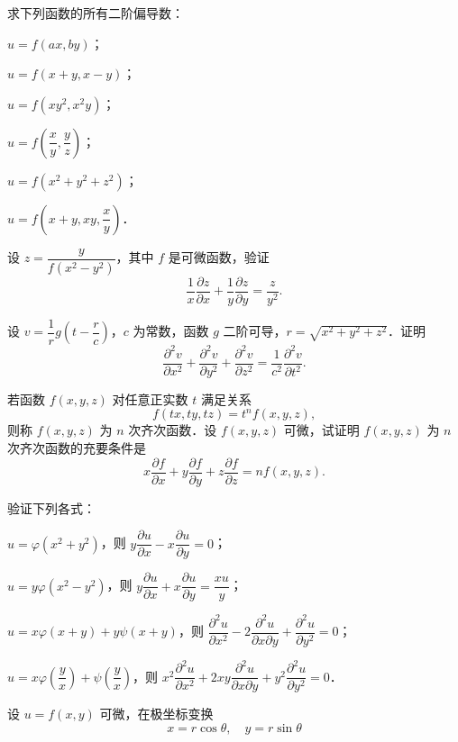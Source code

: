 \begin{xiti}
\item 求下列函数的所有二阶偏导数：
\begin{ziti}
\item $u=f(ax,by)$；
\item $u=f(x+y,x-y)$；
\item $u=f(xy^{2},x^{2}y)$；
\item $u=f\left(\dfrac{x}{y},\dfrac{y}{z}\right)$；
\item $u=f(x^{2}+y^{2}+z^{2})$；
\item $u=f\left(x+y,xy,\dfrac{x}{y}\right)$．
\end{ziti}
\item 设 $z=\dfrac{y}{f(x^{2}-y^{2})}$，其中 $f$ 是可微函数，验证
\[
\frac{1}{x}\frac{\partial z}{\partial x}+\frac{1}{y}\frac{\partial z}{\partial y}=\frac{z}{y^{2}}.
\]
\item 设 $v=\dfrac{1}{r}g\left(t-\dfrac{r}{c}\right)$，$c$ 为常数，函数 $g$ 二阶可导，$r=\sqrt{x^{2}+y^{2}+z^{2}}$．证明
\[
\frac{\partial^{2}v}{\partial x^{2}}+\frac{\partial^{2}v}{\partial y^{2}}+\frac{\partial^{2}v}{\partial z^{2}}=\frac{1}{c^{2}}\frac{\partial^{2}v}{\partial t^{2}}.
\]
\item 若函数 $f(x,y,z)$ 对任意正实数 $t$ 满足关系
\[
f(tx,ty,tz)=t^{n}f(x,y,z),
\]
则称 $f(x,y,z)$ 为 $n$ 次齐次函数．设 $f(x,y,z)$ 可微，试证明 $f(x,y,z)$ 为 $n$ 次齐次函数的充要条件是
\[
x\frac{\partial f}{\partial x}+y\frac{\partial f}{\partial y}+z\frac{\partial f}{\partial z}=nf(x,y,z).
\]
\item 验证下列各式：
\begin{ziti}
\item $u=\varphi(x^{2}+y^{2})$，则 $y\dfrac{\partial u}{\partial x}-x\dfrac{\partial u}{\partial y}=0$；
\item $u=y\varphi(x^{2}-y^{2})$，则 $y\dfrac{\partial u}{\partial x}+x\dfrac{\partial u}{\partial y}=\dfrac{xu}{y}$；
\item $u=x\varphi(x+y)+y\psi(x+y)$，则 $\dfrac{\partial^{2}u}{\partial x^{2}}-2\dfrac{\partial^{2}u}{\partial x\partial y}+\dfrac{\partial^{2}u}{\partial y^{2}}=0$；
\item $u=x\varphi\left(\dfrac{y}{x}\right)+\psi\left(\dfrac{y}{x}\right)$，则 $x^{2}\dfrac{\partial^{2}u}{\partial x^{2}}+2xy\dfrac{\partial^{2}u}{\partial x\partial y}+y^{2}\dfrac{\partial^{2}u}{\partial y^{2}}=0$．
\end{ziti}
\item 设 $u=f(x,y)$ 可微，在极坐标变换
\[
x=r\cos\theta,\quad y=r\sin\theta
\]
\end{xiti}

